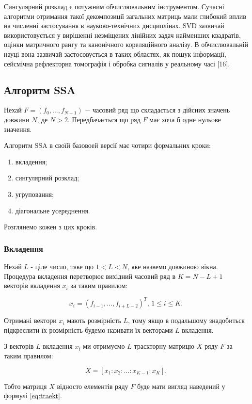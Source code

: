 Сингулярний розклад є потужним обчислювальним інструментом. Сучасні алгоритми отримання такої декомпозиції загальних матриць мали глибокий вплив на численні застосування в науково-технічних дисциплінах. SVD зазвичай використовується у вирішенні незміщених лінійних задач найменших квадратів, оцінки матричного рангу та канонічного кореляційного аналізу. В обчислювальній науці вона зазвичай застосовується в таких областях, як пошук інформації, сейсмічна рефлекторна томографія і обробка сигналів у реальному часі [16].

\subsection{Алгоритм SSA}

Нехай $F = (f_{0}, \dots, f_{N-1})$ $-$ часовий ряд що складається з дійсних значень довжини $N$, де $N > 2$. Передбачається що ряд $F$ має хоча б одне нульове значення.

Алгоритм SSA в своїй базовоей версії має чотири формальних кроки: 

\begin{enumerate}
	\item вкладення; 
	\item сингулярний розклад;
	\item угруповання;
	\item діагональне усереднення. 
\end{enumerate}	
Розглянемо кожен з цих кроків.

\subsubsection{Вкладення}

Нехай $L$ - ціле число, таке що $1 < L < N$, яке назвемо довжиною вікна. Процедура вкладення перетворює вихідний часовий ряд в $K = N - L + 1$ векторів вкладення $x_{i}$ за таким правилом:

\[
x_{i} = (f_{i-1}, \dots, f_{i+L-2})^{T}, \, 1 \le i \le K.
\]

Отримані вектори $x_{i}$ мають розмірність $L$, тому якщо в подальшому знадобиться підкреслити їх розмірність будемо називати їх векторами $L$-вкладення.

З векторів $L$-вкладення $x_{i}$ ми отримуємо $L$-траєкторну матрицю $X$ ряду $F$ за таким правилом:

\[
X = [x_{1} : x_{2} : \dots : x_{K-1} : x_{K}].
\]

Тобто матриця $X$ відносто елементів ряду $F$ буде мати вигляд наведений у формулі \ref{eq:traekt}.

